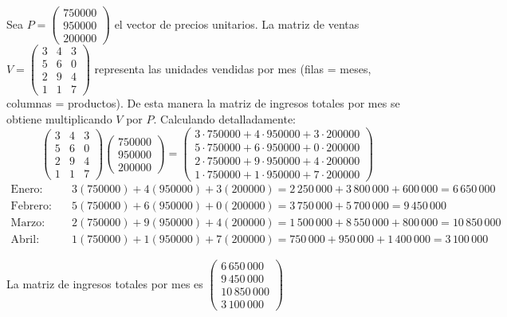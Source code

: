 \begin{myproof}
Sea $P = \begin{pmatrix} 750000 \\ 950000 \\ 200000 \end{pmatrix}$ el vector de precios unitarios. La matriz de ventas $V = \begin{pmatrix}
3 & 4 & 3 \\
5 & 6 & 0 \\
2 & 9 & 4 \\
1 & 1 & 7 
\end{pmatrix}$ representa las unidades vendidas por mes (filas = meses, columnas = productos). De esta manera la matriz de ingresos totales por mes se obtiene multiplicando $V$ por $P$. Calculando detalladamente:
\[
\begin{pmatrix}
3 & 4 & 3 \\
5 & 6 & 0 \\
2 & 9 & 4 \\
1 & 1 & 7 
\end{pmatrix}
\begin{pmatrix}
750000 \\ 950000 \\ 200000
\end{pmatrix}
= \begin{pmatrix}
3\cdot750000 + 4\cdot950000 + 3\cdot200000 \\
5\cdot750000 + 6\cdot950000 + 0\cdot200000 \\
2\cdot750000 + 9\cdot950000 + 4\cdot200000 \\
1\cdot750000 + 1\cdot950000 + 7\cdot200000
\end{pmatrix}
\]
\begin{align*}
\text{Enero:}  & \quad 3(750000) + 4(950000) + 3(200000) = 2\,250\,000 + 3\,800\,000 + 600\,000 = 6\,650\,000 \\
\text{Febrero:} & \quad 5(750000) + 6(950000) + 0(200000) = 3\,750\,000 + 5\,700\,000 = 9\,450\,000 \\
\text{Marzo:}  & \quad 2(750000) + 9(950000) + 4(200000) = 1\,500\,000 + 8\,550\,000 + 800\,000 = 10\,850\,000 \\
\text{Abril:}  & \quad 1(750000) + 1(950000) + 7(200000) = 750\,000 + 950\,000 + 1\,400\,000 = 3\,100\,000
\end{align*}

La matriz de ingresos totales por mes es \(
\boxed{\begin{pmatrix}
6\,650\,000 \\
9\,450\,000 \\
10\,850\,000 \\
3\,100\,000
\end{pmatrix}}
\)
\end{myproof}

